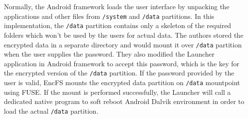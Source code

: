 Normally, the Android framework loads the user interface by unpacking the applications and other files from \texttt{/system} and \texttt{/data} partitions. In this implementation, the \texttt{/data} partition contains only a skeleton of the required folders which won’t be used by the users for actual data. The authors stored the encrypted data in a separate directory and would mount it over \texttt{/data} partition when the user supplies the password.
They also modified the Launcher application in Android framework to accept this password, which is the key for the encrypted version of the \texttt{/data} partition. If the password provided by the user is valid, EncFS mounts the encrypted data partition on \texttt{/data} mountpoint using FUSE. If the mount is performed successfully, the Launcher will call a dedicated native program to soft reboot Android Dalvik environment in order to load the actual \texttt{/data} partition.